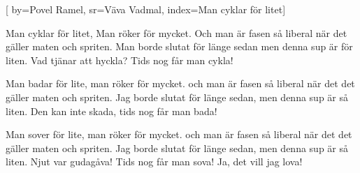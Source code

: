 [ 		
	by={Povel Ramel},					
	sr={Väva Vadmal},					
	index={Man cyklar för litet}]		
	
\beginverse*						
Man cyklar för litet, 
Man röker för mycket.
Och man är fasen så liberal 
när det gäller maten och spriten. 
Man borde slutat för länge sedan
men denna sup är för liten.
Vad tjänar att hyckla? 
Tids nog får man cykla!
\endverse										

\beginverse*
Man badar för lite,
man röker för mycket.
och man är fasen så liberal
när det det gäller maten och spriten.
Jag borde slutat för länge sedan,
men denna sup är så liten.
Den kan inte skada,
tids nog får man bada!
\endverse

\beginverse*
Man sover för lite,
man röker för mycket.
och man är fasen så liberal
när det det gäller maten och spriten.
Jag borde slutat för länge sedan,
men denna sup är så liten.
Njut var gudagåva!
Tids nog får man sova!
Ja, det vill jag lova! 
\endverse										

\endsong		
